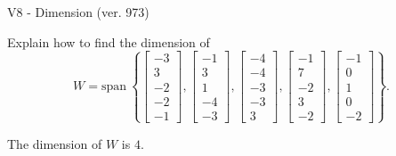 \begin{exercise}
  \begin{exerciseTitle}V8 - Dimension (ver. 973)\end{exerciseTitle}
  \begin{exerciseStatement}
    Explain how to find the dimension of 
\[W=\mathrm{span}\ \left\{\left[\begin{array}{r}
-3 \\
3 \\
-2 \\
-2 \\
-1
\end{array}\right] , \left[\begin{array}{r}
-1 \\
3 \\
1 \\
-4 \\
-3
\end{array}\right] , \left[\begin{array}{r}
-4 \\
-4 \\
-3 \\
-3 \\
3
\end{array}\right] , \left[\begin{array}{r}
-1 \\
7 \\
-2 \\
3 \\
-2
\end{array}\right] , \left[\begin{array}{r}
-1 \\
0 \\
1 \\
0 \\
-2
\end{array}\right]\right\}.\]



  \end{exerciseStatement}
  \begin{exerciseAnswer}
   The dimension of \(W\) is  \(4\).
  


  \end{exerciseAnswer}
\end{exercise}